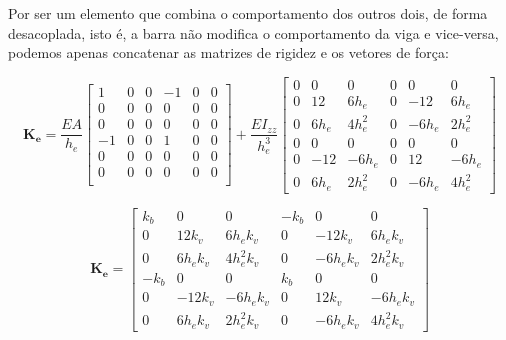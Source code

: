         Por ser um elemento que combina o comportamento dos outros dois, de forma desacoplada, isto é, a barra não modifica o comportamento da viga e vice-versa, podemos apenas concatenar as matrizes de rigidez e os vetores de força:

        \begin{equation}
            \mathbf{K_e}=
            \frac{EA}{h_e}
            \begin{bmatrix}
                1 & 0 & 0 & -1 & 0 & 0\\
                0 & 0 & 0 & 0 & 0 & 0\\
                0 & 0 & 0 & 0 & 0 & 0\\
                -1 & 0 & 0 & 1 & 0 & 0\\
                0 & 0 & 0 & 0 & 0 & 0\\
                0 & 0 & 0 & 0 & 0 & 0\\
            \end{bmatrix}+
            \frac{EI_{zz}}{h_e^3}
            \begin{bmatrix}
                0 & 0 & 0 & 0 & 0 & 0\\
                0 & 12   & 6h_e   & 0 &  -12   & 6h_e   \\
                0 & 6h_e & 4h_e^2 & 0 &  -6h_e & 2h_e^2 \\
                0 & 0 & 0 & 0 & 0 & 0\\
                0 & -12  & -6h_e  & 0 &  12    & -6h_e  \\
                0 & 6h_e & 2h_e^2 & 0 &  -6h_e & 4h_e^2
            \end{bmatrix}
        \end{equation}

        \begin{equation}
            \mathbf{K_e}=
            \begin{bmatrix}
                k_b & 0 & 0 & -k_b & 0 & 0\\
                0 & 12 k_v   & 6h_e k_v   & 0 &  -12k_v   & 6h_e k_v   \\
                0 & 6h_e k_v & 4h_e^2k_v & 0 &  -6h_e k_v & 2h_e^2k_v \\
                -k_b & 0 & 0 & k_b & 0 & 0\\
                0 & -12k_v  & -6h_e k_v  & 0 &  12k_v    & -6h_ek_v \\
                0 & 6h_e k_v & 2h_e^2k_v & 0 &  -6h_e k_v & 4h_e^2k_v 
            \end{bmatrix}
        \end{equation}

